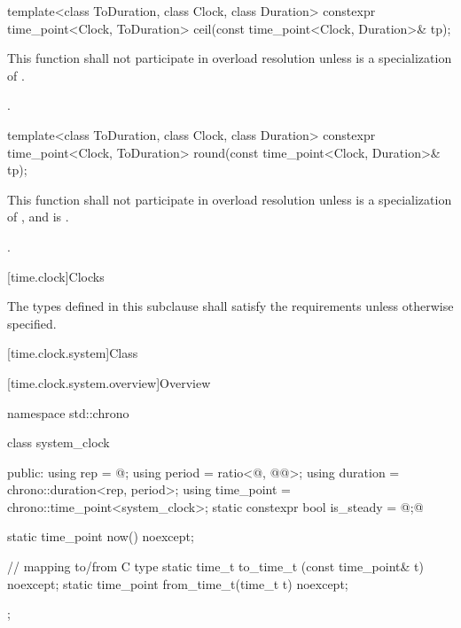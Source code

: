 %
\begin{itemdecl}
template<class ToDuration, class Clock, class Duration>
  constexpr time_point<Clock, ToDuration> ceil(const time_point<Clock, Duration>& tp);
\end{itemdecl}

\begin{itemdescr}
\pnum
\remarks This function shall not participate in overload resolution
unless  is a specialization of .

\pnum
\returns {}.
\end{itemdescr}

%
\begin{itemdecl}
template<class ToDuration, class Clock, class Duration>
  constexpr time_point<Clock, ToDuration> round(const time_point<Clock, Duration>& tp);
\end{itemdecl}

\begin{itemdescr}
\pnum
\remarks This function shall not participate in overload resolution
unless  is a specialization of , and
 is .

\pnum
\returns {}.
\end{itemdescr}

[time.clock]{Clocks}

\pnum
The types defined in this subclause shall satisfy the
requirements
unless otherwise specified.

[time.clock.system]{Class }

[time.clock.system.overview]{Overview}
%

\begin{codeblock}
namespace std::chrono {
  class system_clock {
  public:
    using rep        = @\seebelow@;
    using period     = ratio<@\unspecnc@, @\unspec{}@>;
    using duration   = chrono::duration<rep, period>;
    using time_point = chrono::time_point<system_clock>;
    static constexpr bool is_steady = @\unspec;@

    static time_point now() noexcept;

    // mapping to/from C type 
    static time_t      to_time_t  (const time_point& t) noexcept;
    static time_point  from_time_t(time_t t) noexcept;
  };
}
\end{codeblock}

